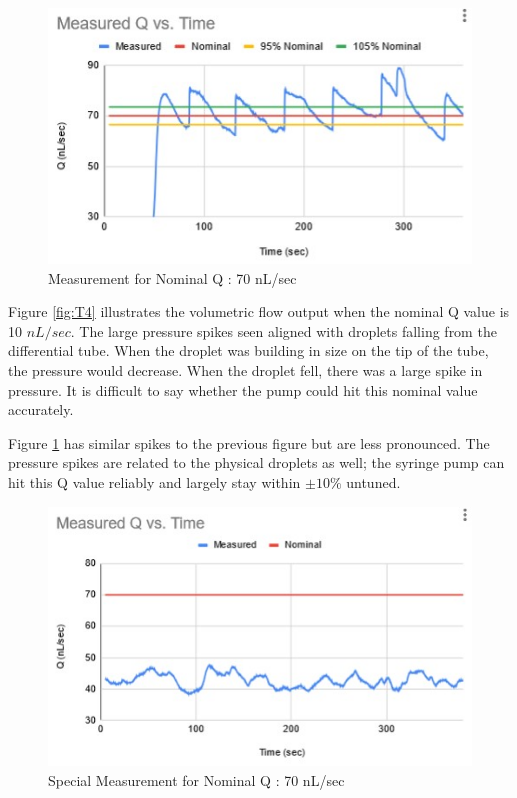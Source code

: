 \documentclass[journal]{IEEEtran}
\begin{document}
                \begin{figure}[H]
                    \centering
                    \includegraphics[scale = 0.65]{T5}
                    \caption{Measurement for Nominal Q : 70 nL/sec}
                    \label{fig:T5}
                \end{figure}
                
            Figure \ref{fig:T4} illustrates the volumetric flow output when the nominal Q value is 10 \(nL/sec\). The large pressure spikes seen aligned with droplets falling from the differential tube. When the droplet was building in size on the tip of the tube, the pressure would decrease. When the droplet fell, there was a large spike in pressure. It is difficult to say whether the pump could hit this nominal value accurately. 
            
            Figure \ref{fig:T5} has similar spikes to the previous figure but are less pronounced. The pressure spikes are related to the physical droplets as well; the syringe pump can hit this Q value reliably and largely stay within \( \pm 10 \% \) untuned.
            
            \begin{figure}[H]
                \centering
                \includegraphics[scale = 0.65]{T7}
                \caption{Special Measurement for Nominal Q : 70 nL/sec}
                \label{fig:T7}
            \end{figure}
            
\end{document}
